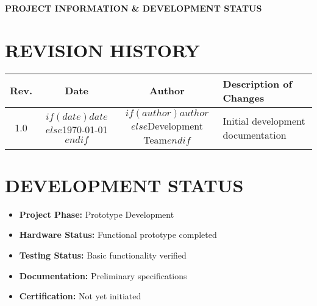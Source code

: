 \documentclass[11pt,a4paper]{article}
\begin{document}
\begin{titlepage}
\end{titlepage}

\begin{titlepage}
    \vspace*{2cm}
    
    \begin{center}
    {\Large \textbf{PROJECT INFORMATION \& DEVELOPMENT STATUS}}
    \end{center}
    
    \vspace{1cm}
    
    \section*{REVISION HISTORY}
    \begin{longtable}{|c|c|c|l|}
    \hline
    \textbf{Rev.} & \textbf{Date} & \textbf{Author} & \textbf{Description of Changes} \\
    \hline
    1.0 & $if(date)$$date$$else$\today$endif$ & $if(author)$$author$$else$Development Team$endif$ & Initial development documentation \\
    \hline
    \end{longtable}
    
    \vspace{1cm}
    
    \section*{DEVELOPMENT STATUS}
    \begin{itemize}
        \item \textbf{Project Phase:} Prototype Development
        \item \textbf{Hardware Status:} Functional prototype completed
        \item \textbf{Testing Status:} Basic functionality verified
        \item \textbf{Documentation:} Preliminary specifications
        \item \textbf{Certification:} Not yet initiated
    \end{itemize}
    
    \vspace{1cm}
    

\end{titlepage}
\end{document}
